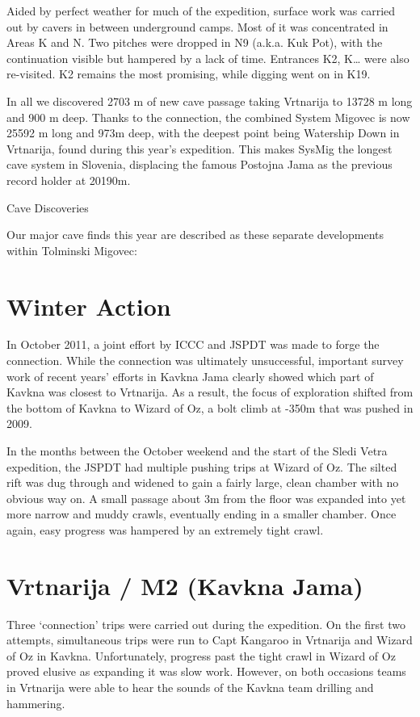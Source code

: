 Aided by perfect weather for much of the expedition, surface work was
carried out by cavers in between underground camps. Most of it was
concentrated in Areas K and N. Two pitches were dropped in N9 (a.k.a.
Kuk Pot), with the continuation visible but hampered by a lack of time.
Entrances K2, K\ldots{} were also re-visited. K2 remains the most
promising, while digging went on in K19.

In all we discovered 2703 m of new cave passage taking Vrtnarija to
13728 m long and 900 m deep. Thanks to the connection, the combined
System Migovec is now 25592 m long and 973m deep, with the deepest point
being Watership Down in Vrtnarija, found during this year's expedition.
This makes SysMig the longest cave system in Slovenia, displacing the
famous Postojna Jama as the previous record holder at 20190m.

Cave Discoveries

Our major cave finds this year are described as these separate
developments within Tolminski Migovec:

\hypertarget{winter-action}{%
\section{Winter Action}\label{winter-action}}

In October 2011, a joint effort by ICCC and JSPDT was made to forge the
connection. While the connection was ultimately unsuccessful, important
survey work of recent years' efforts in Kavkna Jama clearly showed which
part of Kavkna was closest to Vrtnarija. As a result, the focus of
exploration shifted from the bottom of Kavkna to Wizard of Oz, a bolt
climb at -350m that was pushed in 2009.

In the months between the October weekend and the start of the Sledi
Vetra expedition, the JSPDT had multiple pushing trips at Wizard of Oz.
The silted rift was dug through and widened to gain a fairly large,
clean chamber with no obvious way on. A small passage about 3m from the
floor was expanded into yet more narrow and muddy crawls, eventually
ending in a smaller chamber. Once again, easy progress was hampered by
an extremely tight crawl.

\hypertarget{vrtnarija-m2-kavkna-jama}{%
\section{Vrtnarija / M2 (Kavkna Jama)}\label{vrtnarija-m2-kavkna-jama}}

Three `connection' trips were carried out during the expedition. On the
first two attempts, simultaneous trips were run to Capt Kangaroo in
Vrtnarija and Wizard of Oz in Kavkna. Unfortunately, progress past the
tight crawl in Wizard of Oz proved elusive as expanding it was slow
work. However, on both occasions teams in Vrtnarija were able to hear
the sounds of the Kavkna team drilling and hammering.

